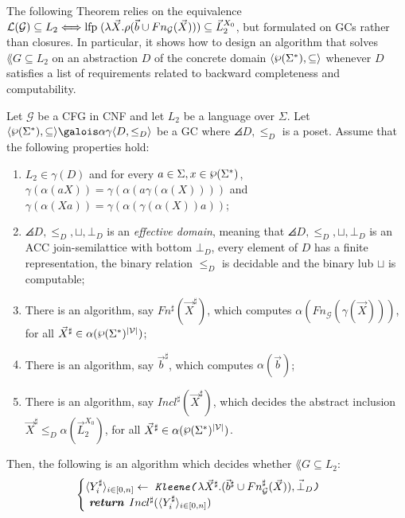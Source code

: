 The following Theorem relies on the equivalence
$\mathcal{L}(\mathcal{G}) \subseteq L_2 \Longleftrightarrow \textrm{lfp}\; (\lambda \vec{X}. \rho(\vec{b} \cup Fn_{\mathcal{G}}(\vec{X}))) \subseteq \vec{L}_2^{X_0}$,
but formulated on GCs rather than closures.
In particular, it shows how to design an algorithm that solves $\lang{G} \subseteq L_2$
on an abstraction $D$ of the concrete domain $\angles{\powersetSigmas, \subseteq}$
whenever $D$ satisfies a list of requirements related to backward completeness
and computability.
\begin{theorem}
\label{theorem:compute-cfg}
Let $\mathcal{G}$ be a CFG in CNF and let $L_2$ be a language over $\Sigma$.
Let $\gc{\powerset(\Sigma^*)}{\subseteq}{D}{\leq_D}$ be a GC where $\angles{D, \leq_D}$
is a poset.
Assume that the following properties hold:
\begin{enumerate}
\item $L_2 \in \gamma(D)$ and for every $a \in \Sigma, x \in \powerset (\Sigma^*)$,
$\gamma(\alpha(aX)) = \gamma(\alpha(a\gamma(\alpha(X))))$ and
$\gamma(\alpha(Xa)) = \gamma(\alpha(\gamma(\alpha(X))a))$;
\item $\angles{D, \leq_D, \sqcup, \bot_D}$ is an \emph{effective domain}, meaning that
$\angles{D, \leq_D, \sqcup, \bot_D}$ is an ACC join-semilattice with bottom
$\bot_D$, every element of $D$ has a finite representation, the binary relation
$\leq_D$ is decidable and the binary lub $\sqcup$ is computable;
\item There is an algorithm, say $Fn^{\sharp}(\vec{X}^{\sharp})$,
which computes $\alpha(Fn_{\mathcal{G}}(\gamma(\vec{X})))$, for all
$\vec{X}^{\sharp} \in \alpha(\powerset(\Sigma^*)^{|\mathcal{V}|})$;
\item There is an algorithm, say $\vec{b}^{\sharp}$, which computes $\alpha(\vec{b})$;
\item There is an algorithm, say $Incl^{\sharp}(\vec{X}^{\sharp})$, which decides
the abstract inclusion $\vec{X}^{\sharp} \leq_D \alpha(\vec{L}_2^{X_0})$,
for all $\vec{X}^{\sharp} \in \alpha(\powerset(\Sigma^*)^{|\mathcal{V}|})$.
\end{enumerate}
Then, the following is an algorithm which decides whether $\lang{G} \subseteq L_2$:
\[
\begin{cases}
\langle Y_i^{\sharp} \rangle_{i \in [0,n]} \leftarrow \textrm{ \emph{\texttt{Kleene(}}}
\lambda \vec{X}^{\sharp}. (\vec{b}^{\sharp} \cup Fn^{\sharp}_{\mathcal{G}}(\vec{X})), \vec{\bot}_D \textrm{\emph{\texttt{)}} } \\
\textrm{ \emph{\textbf{return }}} Incl^{\sharp}(\langle Y_i^{\sharp} \rangle_{i \in [0,n]})
\end{cases}\]
\end{theorem}

